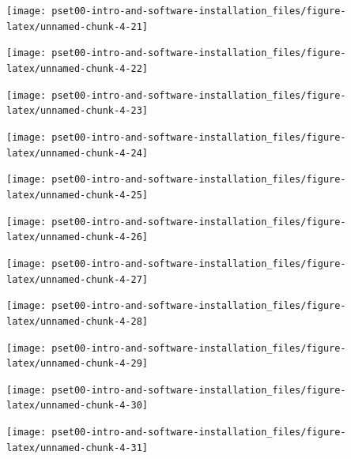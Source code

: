 \documentclass[
]{article}
\begin{document}
\begin{center}\texttt{[image: pset00-intro-and-software-installation\_files/figure-latex/unnamed-chunk-4-21]} \end{center}

\begin{center}\texttt{[image: pset00-intro-and-software-installation\_files/figure-latex/unnamed-chunk-4-22]} \end{center}

\begin{center}\texttt{[image: pset00-intro-and-software-installation\_files/figure-latex/unnamed-chunk-4-23]} \end{center}

\begin{center}\texttt{[image: pset00-intro-and-software-installation\_files/figure-latex/unnamed-chunk-4-24]} \end{center}

\begin{center}\texttt{[image: pset00-intro-and-software-installation\_files/figure-latex/unnamed-chunk-4-25]} \end{center}

\begin{center}\texttt{[image: pset00-intro-and-software-installation\_files/figure-latex/unnamed-chunk-4-26]} \end{center}

\begin{center}\texttt{[image: pset00-intro-and-software-installation\_files/figure-latex/unnamed-chunk-4-27]} \end{center}

\begin{center}\texttt{[image: pset00-intro-and-software-installation\_files/figure-latex/unnamed-chunk-4-28]} \end{center}

\begin{center}\texttt{[image: pset00-intro-and-software-installation\_files/figure-latex/unnamed-chunk-4-29]} \end{center}

\begin{center}\texttt{[image: pset00-intro-and-software-installation\_files/figure-latex/unnamed-chunk-4-30]} \end{center}

\begin{center}\texttt{[image: pset00-intro-and-software-installation\_files/figure-latex/unnamed-chunk-4-31]} \end{center}
\end{document}

